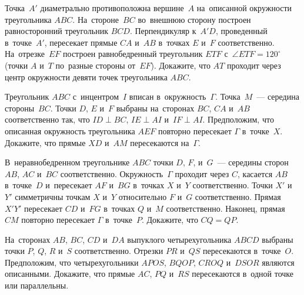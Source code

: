 


\begin{problems}

\item
Точка~$A'$ диаметрально противоположна вершине~$A$ на~описанной окружности
треугольника $ABC$.
На~стороне~$BC$ во~внешнюю сторону построен равносторонний треугольник $BCD$.
Перпендикуляр к~$A'D$, проведенный в~точке~$A'$, пересекает прямые $CA$ и~$AB$
в~точках $E$ и~$F$ соответственно.
На~отрезке~$EF$ построен равнобедренный треугольник $ETF$
с~$\angle ETF = 120^\circ$ (точки $A$ и~$T$ по~разные стороны от~$EF$).
Докажите, что $AT$ проходит через центр окружности девяти точек
треугольника $ABC$.

\item
Треугольник $ABC$ с~инцентром~$I$ вписан в~окружность~$\Gamma$.
Точка~$M$~--- середина стороны~$BC$.
Точки $D$, $E$ и~$F$ выбраны на~сторонах $BC$, $CA$ и~$AB$ соответственно так,
что $ID \perp BC$, $IE\perp AI$ и~$IF \perp AI$.
Предположим, что описанная окружность треугольника $AEF$ повторно пересекает
$\Gamma$ в~точке~$X$.
Докажите, что прямые $XD$ и~$AM$ пересекаются на~$\Gamma$.

\item
В~неравнобедренном треугольнике $ABC$ точки $D$, $F$, и~$G$~--- середины
сторон $AB$, $AC$ и~$BC$ соответственно.
Окружность~$\Gamma$ проходит через $C$, касается $AB$ в~точке~$D$
и~пересекает $AF$ и~$BG$ в~точках $X$ и~$Y$ соответственно.
Точки $X'$ и~$Y'$ симметричны точкам $X$ и~$Y$ относительно $F$ и~$G$
соответственно.
Прямая~$X'Y'$ пересекает $CD$ и~$FG$ в~точках $Q$ и~$M$ соответственно.
Наконец, прямая $CM$ повторно пересекает $\Gamma$ в~точке~$P$.
Докажите, что $CQ = QP$.

\item
На~сторонах $AB$, $BC$, $CD$ и~$DA$ выпуклого четырехугольника $ABCD$ выбраны
точки $P$, $Q$, $R$ и~$S$ соответственно.
Отрезки $PR$ и~$QS$ пересекаются в~точке~$O$.
Предположим, что четырехугольники $APOS$, $BQOP$, $CROQ$ и~$DSOR$ являются
описанными.
Докажите, что прямые $AC$, $PQ$ и~$RS$ пересекаются в~одной точке или
параллельны.


\end{problems}
